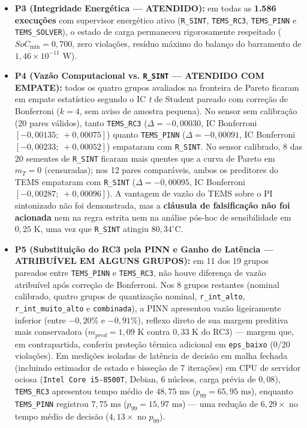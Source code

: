 \begin{itemize}
    \item \textbf{P3 (Integridade Energética — ATENDIDO):} em todas as \textbf{1.586 execuções} com supervisor energético ativo (\texttt{R\_SINT}, \texttt{TEMS\_RC3}, \texttt{TEMS\_PINN} e \texttt{TEMS\_SOLVER}), o estado de carga permaneceu rigorosamente respeitado ($SoC_{\min} = 0{,}700$, zero violações, resíduo máximo do balanço do barramento de $1{,}46 \times 10^{-11}\text{ W}$).

    \item \textbf{P4 (Vazão Computacional vs. \texttt{R\_SINT} — ATENDIDO COM EMPATE):} todos os quatro grupos avaliados na fronteira de Pareto ficaram em empate estatístico segundo o IC \textit{t} de Student pareado com correção de Bonferroni ($k = 4$, sem aviso de amostra pequena). No sensor sem calibração (20 pares válidos), tanto \texttt{TEMS\_RC3} ($\Delta = -0{,}00030$, IC Bonferroni $[-0{,}00135;\; +0{,}00075]$) quanto \texttt{TEMS\_PINN} ($\Delta = -0{,}00091$, IC Bonferroni $[-0{,}00233;\; +0{,}00052]$) empataram com \texttt{R\_SINT}. No sensor calibrado, 8 das 20 sementes de \texttt{R\_SINT} ficaram mais quentes que a curva de Pareto em $m_T = 0$ (censuradas); nos 12 pares comparáveis, ambos os preditores do TEMS empataram com \texttt{R\_SINT} ($\Delta = -0{,}00095$, IC Bonferroni $[-0{,}00287;\; +0{,}00096]$). A vantagem de vazão do TEMS sobre o PI sintonizado não foi demonstrada, mas a \textbf{cláusula de falsificação não foi acionada} nem na regra estrita nem na análise pós-hoc de sensibilidade em $0{,}25\text{ K}$, uma vez que \texttt{R\_SINT} atingiu $80{,}34^\circ\text{C}$.

    \item \textbf{P5 (Substituição do RC3 pela PINN e Ganho de Latência — ATRIBUÍVEL EM ALGUNS GRUPOS):} em 11 dos 19 grupos pareados entre \texttt{TEMS\_PINN} e \texttt{TEMS\_RC3}, não houve diferença de vazão atribuível após correção de Bonferroni. Nos 8 grupos restantes (nominal calibrado, quatro grupos de quantização nominal, \texttt{r\_int\_alto}, \texttt{r\_int\_muito\_alto} e \texttt{combinada}), a PINN apresentou vazão ligeiramente inferior (entre $-0{,}20\%$ e $-0{,}91\%$), reflexo direto de sua margem preditiva mais conservadora ($m_{pred} = 1{,}09\text{ K}$ contra $0{,}33\text{ K}$ do RC3) — margem que, em contrapartida, conferiu proteção térmica adicional em \texttt{eps\_baixo} (0/20 violações). Em medições isoladas de latência de decisão em malha fechada (incluindo estimador de estado e bisseção de 7 iterações) em CPU de servidor ociosa (\texttt{Intel Core i5-8500T}, Debian, 6 núcleos, carga prévia de $0{,}08$), \texttt{TEMS\_RC3} apresentou tempo médio de \textbf{$48{,}75\text{ ms}$} ($p_{99} = 65{,}95\text{ ms}$), enquanto \texttt{TEMS\_PINN} registrou \textbf{$7{,}75\text{ ms}$} ($p_{99} = 15{,}97\text{ ms}$) — uma redução de \textbf{$6{,}29\times$} no tempo médio de decisão ($4{,}13\times$ no $p_{99}$).
\end{itemize}

